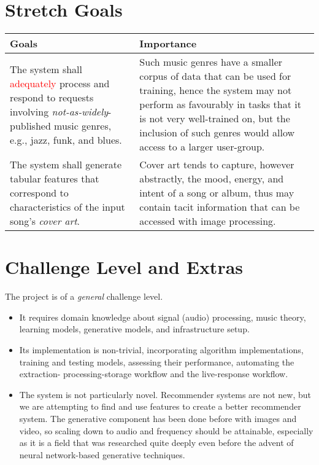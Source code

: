 \documentclass{article}
\begin{document}
\section{Stretch Goals}
\begin{table}[h]
    \centering
    \begin{tabular}{|| p{} | p{} ||}
        \hline
        \textbf{Goals} & \textbf{Importance} \\
        \hline
        The system shall \textcolor{red}{adequately} process and respond to 
        requests involving \emph{not-as-widely}-published music genres, e.g., 
        jazz, funk, and blues. & Such music genres have a smaller corpus of 
        data that can be used for training, hence the system may not perform 
        as favourably in tasks that it is not very well-trained on, but the 
        inclusion of such genres would allow access to a larger user-group. \\
        \hline
        The system shall generate tabular features that correspond to 
        characteristics of the input song's \emph{cover art}. & Cover art tends 
        to capture, however abstractly, the mood, energy, and intent of a song 
        or album, thus may contain tacit information that can be accessed with 
        image processing. \\
        \hline
    \end{tabular}
\end{table}

\section{Challenge Level and Extras}

The project is of a \emph{general} challenge level.
\begin{itemize}
    \item It requires domain knowledge about signal (audio) processing, music
    theory, learning models, generative models, and infrastructure setup.
    \item Its implementation is non-trivial, incorporating algorithm implementations, 
    training and testing models, assessing their performance, automating the extraction-
    processing-storage workflow and the live-response workflow.
    \item The system is not particularly novel. Recommender systems are not new, but we are 
    attempting to find and use features to create a better recommender system. The generative 
    component has been done before with images and video, so scaling down to audio and frequency 
    should be attainable, especially as it is a field that was researched quite deeply even before 
    the advent of neural network-based generative techniques.
\end{itemize}
\end{document}
